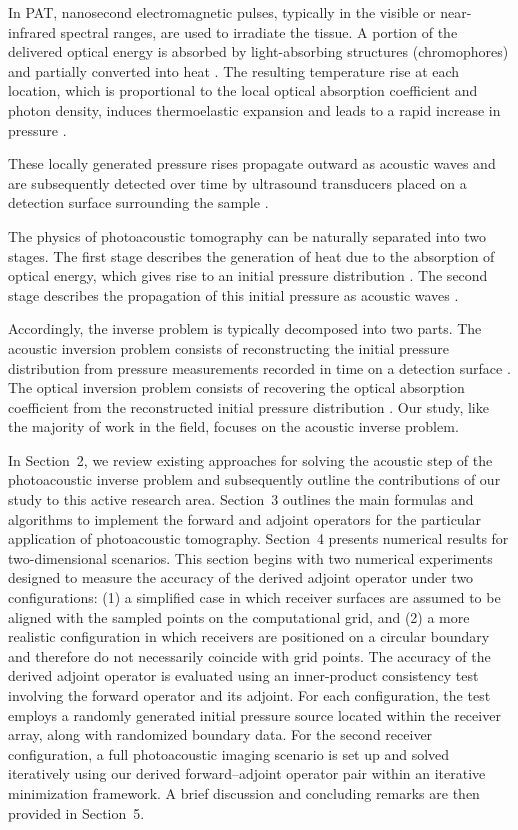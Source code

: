 \documentclass[11pt,reqno]{amsart}
\theoremstyle{remark}
\begin{document}
In PAT, nanosecond electromagnetic pulses, typically in the visible or near-infrared spectral ranges, are used to irradiate the tissue. A portion of the delivered optical energy is absorbed by light-absorbing structures (chromophores) and partially converted into heat \cite{Rosencwaig1976,Li2009}. The resulting temperature rise at each location, which is proportional to the local optical absorption coefficient and photon density, induces thermoelastic expansion and leads to a rapid increase in pressure \cite{Li2009}. 

These locally generated pressure rises propagate outward as acoustic waves and are subsequently detected over time by ultrasound transducers placed on a detection surface surrounding the sample \cite{Xu2006,Li2009}.


The physics of photoacoustic tomography can be naturally separated into two stages. The first stage describes the generation of heat due to the absorption of optical energy, which gives rise to an initial pressure distribution \cite{Li2009,Bal2010}. The second stage describes the propagation of this initial pressure as acoustic waves \cite{Xu2006,Kruger1995}.

Accordingly, the inverse problem is typically decomposed into two parts. The acoustic inversion problem consists of reconstructing the initial pressure distribution from pressure measurements recorded in time on a detection surface \cite{Xu2006,Kruger1995}. The optical inversion problem consists of recovering the optical absorption coefficient from the reconstructed initial pressure distribution \cite{Li2009,Bal2010,Javaherian2019}. Our study, like the majority of work in the field, focuses on the acoustic inverse problem.



In Section~2, we review existing approaches for solving the acoustic step of the photoacoustic inverse problem and subsequently outline the contributions of our study to this active research area. Section~3 outlines the main formulas and algorithms to implement the forward and adjoint operators for the particular application of photoacoustic tomography. Section~4 presents numerical results for two-dimensional scenarios. This section begins with two numerical experiments designed to measure the accuracy of the derived adjoint operator under two configurations: (1) a simplified case in which receiver surfaces are assumed to be aligned with the sampled points on the computational grid, and (2) a more realistic configuration in which receivers are positioned on a circular boundary and therefore do not necessarily coincide with grid points. The accuracy of the derived adjoint operator is evaluated using an inner-product consistency test involving the forward operator and its adjoint. For each configuration, the test employs a randomly generated initial pressure source located within the receiver array, along with randomized boundary data. For the second receiver configuration, a full photoacoustic imaging scenario is set up and solved iteratively using our derived forward–adjoint operator pair within an iterative minimization framework. A brief discussion and concluding remarks are then provided in Section~5.
\end{document}
